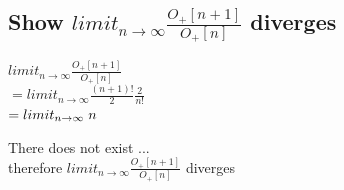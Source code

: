 \documentclass[11pt]{article}
\begin{document}
\subsection{Show $limit_{n \rightarrow \infty}\frac{O_+[n+1]}{O_+[n]}$ diverges}
\begin{center}
$
limit_{n \rightarrow \infty}\frac{O_+[n+1]}{O_+[n]}
$
\\ \vspace{2mm}
$
= limit_{n \rightarrow \infty}\frac{(n+1)!}{2} \frac{2}{n!}
$
\\ \vspace{2mm}
$
= limit_{n \rightarrow \infty}\hspace{1mm} n
$
\end{center}
There does not exist ... \\
therefore $limit_{n \rightarrow \infty}\frac{O_+[n+1]}{O_+[n]}$ diverges
\end{document}
